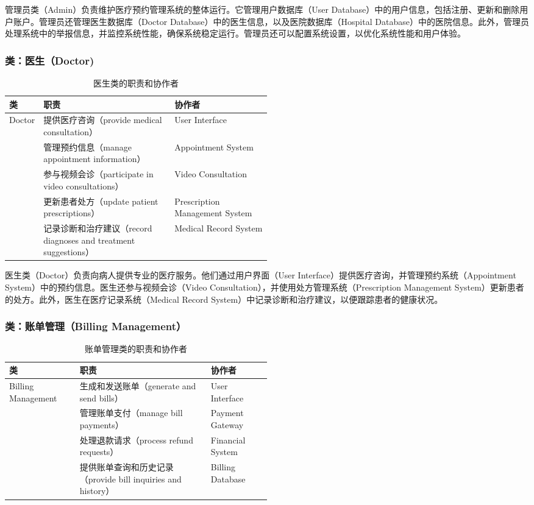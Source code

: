 管理员类（Admin）负责维护医疗预约管理系统的整体运行。它管理用户数据库（User Database）中的用户信息，包括注册、更新和删除用户账户。管理员还管理医生数据库（Doctor Database）中的医生信息，以及医院数据库（Hospital Database）中的医院信息。此外，管理员处理系统中的举报信息，并监控系统性能，确保系统稳定运行。管理员还可以配置系统设置，以优化系统性能和用户体验。

\subsubsection{类：医生（Doctor)}
\begin{table}[htbp]
	\centering
	\begin{tabular}{|l|p{0.5\linewidth}|l|}
		\hline
		\textbf{类} & \textbf{职责} & \textbf{协作者} \\
		\hline
		Doctor & 提供医疗咨询（provide medical consultation） & User Interface \\
		& 管理预约信息（manage appointment information） & Appointment System \\
		& 参与视频会诊（participate in video consultations） & Video Consultation \\
		& 更新患者处方（update patient prescriptions） & Prescription Management System \\
		& 记录诊断和治疗建议（record diagnoses and treatment suggestions） & Medical Record System \\
		\hline
	\end{tabular}
	\caption{医生类的职责和协作者}
	\label{tab:doctor}
\end{table}

医生类（Doctor）负责向病人提供专业的医疗服务。他们通过用户界面（User Interface）提供医疗咨询，并管理预约系统（Appointment System）中的预约信息。医生还参与视频会诊（Video Consultation），并使用处方管理系统（Prescription Management System）更新患者的处方。此外，医生在医疗记录系统（Medical Record System）中记录诊断和治疗建议，以便跟踪患者的健康状况。
\subsubsection{类：账单管理（Billing Management）}
\begin{table}[htbp]
	\centering
	\begin{tabular}{|l|p{0.5\linewidth}|l|}
		\hline
		\textbf{类} & \textbf{职责} & \textbf{协作者} \\
		\hline
		Billing Management & 生成和发送账单（generate and send bills） & User Interface \\
		& 管理账单支付（manage bill payments） & Payment Gateway \\
		& 处理退款请求（process refund requests） & Financial System \\
		& 提供账单查询和历史记录（provide bill inquiries and history） & Billing Database \\
		\hline
	\end{tabular}
	\caption{账单管理类的职责和协作者}
	\label{tab:billing_management}
\end{table}

